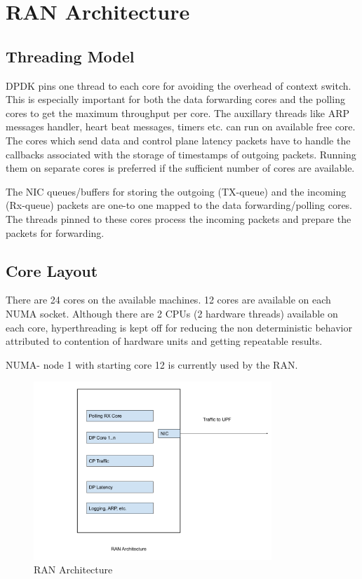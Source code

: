 \section{RAN Architecture}
\subsection{Threading Model}
DPDK pins one thread to each core for avoiding the overhead of context switch.
This is especially important for both the data forwarding cores and the polling
cores to get the maximum throughput per core. The auxillary threads like ARP
messages handler, heart beat messages, timers etc. can run on available free core. The cores which send data and control plane latency packets have to handle the callbacks associated with the storage of timestamps of outgoing packets. Running them on separate cores is preferred if the sufficient number of cores are available.

The NIC queues/buffers for storing the outgoing (TX-queue) and the incoming
(Rx-queue) packets are one-to one mapped to the data forwarding/polling cores.
The threads pinned to these cores process the incoming packets and prepare the packets for forwarding.


\subsection{Core Layout}
There are 24 cores on the available machines. 12 cores are available on each NUMA socket.
Although there are 2 CPUs (2 hardware threads) available on each core, hyperthreading is
kept off for reducing the non deterministic behavior attributed to contention of hardware units
and getting repeatable results.

NUMA- node 1 with starting core 12 is currently used by the RAN.
\begin{figure}[htbp]
	\centering
	\includegraphics[width=0.8\textwidth, keepaspectratio]{./fig/Introduction/RANArchitecture.png}
	\caption{RAN Architecture}
	\label{fig:RAN}
\end{figure}

